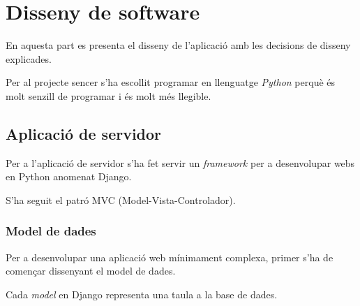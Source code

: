\chapter{Disseny de software}\label{chapter:disseny de software}

En aquesta part es presenta el disseny de l'aplicació amb les decisions de disseny explicades.

Per al projecte sencer s'ha escollit programar en llenguatge \emph{Python} perquè és molt senzill de programar i és molt més llegible.

\section{Aplicació de servidor}
Per a l'aplicació de servidor s'ha fet servir un \textit{framework} per a desenvolupar webs en Python anomenat Django.

S'ha seguit el patró MVC (Model-Vista-Controlador).

\subsection{Model de dades}
Per a desenvolupar una aplicació web mínimament complexa, primer s'ha de començar dissenyant el model de dades.

Cada \textit{model} en Django representa una taula a la base de dades.

